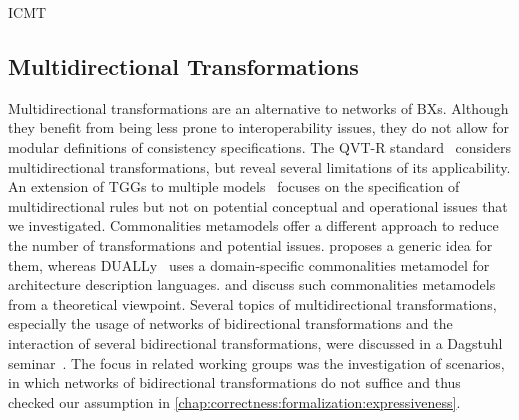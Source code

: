 \begin{copiedFrom}{ICMT}
\subsection*{Multidirectional Transformations}
Multidirectional transformations 
are an alternative to networks of \acp{BX}.
Although they benefit from being less prone to interoperability issues, they do not allow for modular definitions of consistency specifications.
The QVT-R standard~\cite{qvt} considers multidirectional transformations, but \textcite{macedo2014FrameworkMultiDirectional-BX} reveal several limitations of its applicability.
An extension of \acp{TGG} to multiple models~\cite{trollmann2015TransformationTGGtoMultiModel-ICMT, trollmann2016SynchronizationTGGtoMultiModel-ICMT} focuses on the specification of multidirectional rules but not on potential conceptual and operational issues that we investigated.
Commonalities metamodels offer a different approach to reduce the number of transformations and potential issues.
\textcite{gleitze2017a} proposes a generic idea for them, whereas DUALLy~\cite{malavolta2010ADLInteroperability-TSE, eramo2012Dually-SoSym} uses a domain-specific commonalities metamodel for architecture description languages.
\textcite{stunkel2018MultimodelCorrespondence-ICPS} and \textcite{diskin2018MultiModelSynchronization-FASE} discuss such commonalities metamodels from a theoretical viewpoint.
Several topics of multidirectional transformations, especially the usage of networks of bidirectional transformations and the interaction of several bidirectional transformations, were discussed in a Dagstuhl seminar~\cite{cleve2019dagstuhl}.
The focus in related working groups was the investigation of scenarios, in which networks of bidirectional transformations do not suffice and thus checked our assumption in \autoref{chap:correctness:formalization:expressiveness}.



\end{copiedFrom}
